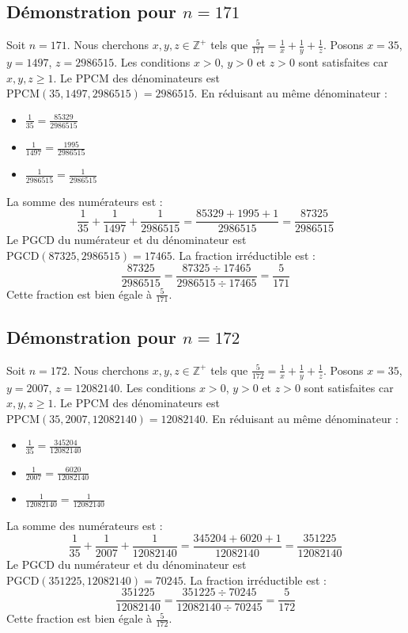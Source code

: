 \documentclass[11pt,a4paper]{article}
\begin{document}
\subsection{Démonstration pour $n = 171$}
Soit $n = 171$. Nous cherchons $x, y, z \in \mathbb{Z}^{+}$ tels que $\frac{5}{171} = \frac{1}{x} + \frac{1}{y} + \frac{1}{z}$.
Posons $x = 35$, $y = 1497$, $z = 2986515$.
Les conditions $x > 0$, $y > 0$ et $z > 0$ sont satisfaites car $x, y, z \geq 1$.
Le PPCM des dénominateurs est $\text{PPCM}(35, 1497, 2986515) = 2986515$.
En réduisant au même dénominateur :
\begin{itemize}
    \item $\frac{1}{35} = \frac{85329}{2986515}$
    \item $\frac{1}{1497} = \frac{1995}{2986515}$
    \item $\frac{1}{2986515} = \frac{1}{2986515}$
\end{itemize}
La somme des numérateurs est :
$$ \frac{1}{35} + \frac{1}{1497} + \frac{1}{2986515} = \frac{85329 + 1995 + 1}{2986515} = \frac{87325}{2986515} $$
Le PGCD du numérateur et du dénominateur est $\text{PGCD}(87325, 2986515) = 17465$.
La fraction irréductible est :
$$ \frac{87325}{2986515} = \frac{87325 \div 17465}{2986515 \div 17465} = \frac{5}{171} $$
Cette fraction est bien égale à $\frac{5}{171}$.

\subsection{Démonstration pour $n = 172$}
Soit $n = 172$. Nous cherchons $x, y, z \in \mathbb{Z}^{+}$ tels que $\frac{5}{172} = \frac{1}{x} + \frac{1}{y} + \frac{1}{z}$.
Posons $x = 35$, $y = 2007$, $z = 12082140$.
Les conditions $x > 0$, $y > 0$ et $z > 0$ sont satisfaites car $x, y, z \geq 1$.
Le PPCM des dénominateurs est $\text{PPCM}(35, 2007, 12082140) = 12082140$.
En réduisant au même dénominateur :
\begin{itemize}
    \item $\frac{1}{35} = \frac{345204}{12082140}$
    \item $\frac{1}{2007} = \frac{6020}{12082140}$
    \item $\frac{1}{12082140} = \frac{1}{12082140}$
\end{itemize}
La somme des numérateurs est :
$$ \frac{1}{35} + \frac{1}{2007} + \frac{1}{12082140} = \frac{345204 + 6020 + 1}{12082140} = \frac{351225}{12082140} $$
Le PGCD du numérateur et du dénominateur est $\text{PGCD}(351225, 12082140) = 70245$.
La fraction irréductible est :
$$ \frac{351225}{12082140} = \frac{351225 \div 70245}{12082140 \div 70245} = \frac{5}{172} $$
Cette fraction est bien égale à $\frac{5}{172}$.
\end{document}
